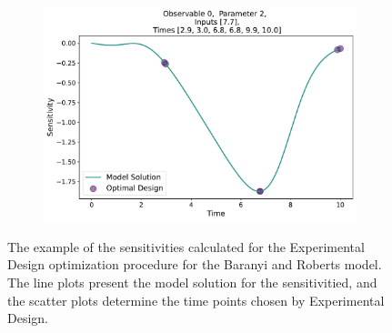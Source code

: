 \documentclass[10pt,A4paper]{article}
\begin{document}
\begin{figure}[H]
    \begin{subfigure}{.9\textwidth}
        \centering
        \includegraphics[scale=0.35]{Figures/Sensitivity_Results_baranyi_roberts_ode_fisher_determinant_rel_sensit_cont_6times_1temps_000_x_00_p_02.pdf}
    \end{subfigure}
    \caption{{\footnotesize The example of the sensitivities calculated for the Experimental Design optimization procedure for the Baranyi and Roberts model.
    The line plots present the model solution for the sensitivitied, and the scatter plots determine the time points chosen by Experimental Design.}} 
    \label{fig:baranyi_roberts_sensitivities}
    \end{figure}
\end{document}

